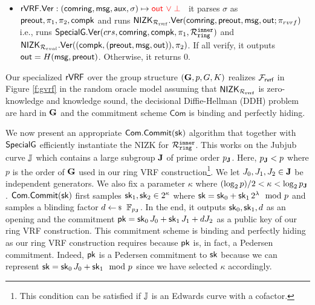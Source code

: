 \begin{itemize}
	\item  $\rVRF.\rVerify : (\comring,\msg,\aux,\sigma) \mapsto {\color{red}\Out \,\, \lor \perp}$ \,
	it parses $\sigma$ as ${\mathsf{preout}},  \pi_1,\pi_2, \mathsf{compk}$ and runs  ${\mathsf{NIZK}}_{\mathcal{R}_{\mathtt{rvrf}}}.{\mathsf{Ver}}(\mathsf{comring}, {\mathsf{preout}}, \mathsf{msg}, {\mathsf{out}}; \pi_{rvrf})$ i.e., runs $ {\mathsf{SpecialG}}.{\mathsf{Ver}}(crs, \mathsf{comring}, \mathsf{compk},\pi_1,\mathcal{R}_{\mathtt{ring}}^{\mathtt{inner}}) $ and $ {\mathsf{NIZK}}_{\mathcal{R}_{eval}}.{\mathsf{Ver}}((\mathsf{compk}, ({\mathsf{preout}}, \mathsf{msg}, {\mathsf{out}})), \pi_2) $. If all verify, it outputs $ {\mathsf{out}} = H(\mathsf{msg},{\mathsf{preout}}) $. Otherwise, it returns 0.
\end{itemize}

\begin{theorem}\label{thm:rvrfspecial}
	Our specialized $ {\mathsf{rVRF}} $  over the group structure $ ({\mathbf{G}},p,G,K) $ realizes $ \mathcal{F}_{\textsf{rvrf}} $ in Figure \ref{f:gvrf} in the random oracle model assuming that $ {\mathsf{NIZK}}_{\mathcal{R}_{\mathtt{rvrf}}} $ is zero-knowledge and knowledge sound, the decisional Diffie-Hellman (DDH) problem are hard in $ {\mathbf{G}}  $ and the commitment scheme $ \mathsf{Com} $ is binding and perfectly hiding. 
\end{theorem}

We now present an appropriate $ \mathsf{Com}.\mathsf{Commit}(\mathsf{sk}) $ algorithm that together with $ {\mathsf{SpecialG}} $ efficiently instantiate the NIZK for $ \mathcal{R}_{\mathtt{ring}}^{\mathtt{inner}} $. This works on the Jubjub curve ${\mathbb{J}}$ which contains a large subgroup ${\mathbf{J}}$ of prime order $p_{\mathbf{J}}$. Here, $p_{\mathbf{J}} < p$ where $ p $ is the order of ${\mathbf{G}}$ used in our ring VRF construction\footnote{\color{red}This condition can be satisfied if ${\mathbb{J}}$ is an Edwards curve with a cofactor.}. We let $J_0,J_1,J_2 \in {\mathbf{J}}$ be independent generators. We also fix a parameter $ \kappa $ where $(\log_2 p)/2 < \kappa < \log_2 p_{\mathbf{J}}$. $ \mathsf{Com}.\mathsf{Commit}(\mathsf{sk}) $ first samples $\mathsf{sk}_1,\mathsf{sk}_2 \in 2^\kappa$  where $\mathsf{sk} = \mathsf{sk}_0 + \mathsf{sk}_1 \, 2^{\lambda} \mod p$ and samples a blinding factor $d \leftsample \F_{p_\grJ} $. In the end, it outputs $ \mathsf{sk}_0, \mathsf{sk}_1,d $ as an opening and the commitment $\mathsf{pk}=\mathsf{sk}_0\, J_0 + \mathsf{sk}_1\, J_1 + d J_2$ as a public key of our ring VRF construction. This commitment scheme is binding and perfectly hiding as our ring VRF construction requires because $ \mathsf{pk} $ is, in fact, a Pedersen commitment. Indeed, $\mathsf{pk}$ is a Pedersen commitment to $\mathsf{sk}$ because we can represent $ \mathsf{sk} = \mathsf{sk}_0\, J_0 + \mathsf{sk}_1 \mod p$ since we have selected $ \kappa $ accordingly.

